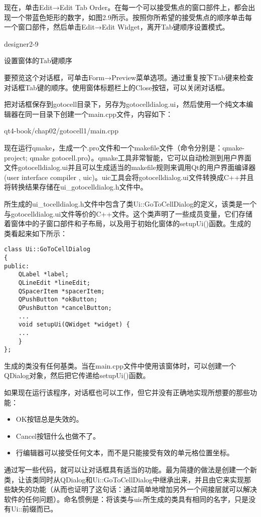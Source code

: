 \documentclass[11pt,oneside]{book}
\begin{document}
\begin{common-format}
现在，单击Edit→Edit Tab Order。在每一个可以接受焦点的窗口部件上，都会出现一个带蓝色矩形的数字，如图2.9所示。按照你所希望的接受焦点的顺序单击每一个窗口部件，然后单击Edit→Edit Widget，离开Tab键顺序设置模式。

\begin{fig}[0.7]{designer2-9}
\caption{设置窗体的Tab键顺序}
\label{fig:designer2-9}
\end{fig}

要预览这个对话框，可单击Form→Preview菜单选项。通过重复按下Tab键来检查对话框Tab键的顺序。使用窗体标题栏上的Close按钮，可以关闭对话框。

把对话框保存到gotocell目录下，另存为gotocelldialog.ui，然后使用一个纯文本编辑器在同一目录下创建一个main.cpp文件，内容如下：
\begin{cppinput}{qt4-book/chap02/gotocell1/main.cpp}
\end{cppinput}

现在运行qmake，生成一个.pro文件和一个makefile文件（命令分别是：qmake-project; qmake gotocell.pro）。qmake工具非常智能，它可以自动检测到用户界面文件gotocelldialog.ui并且可以生成适当的makefile规则来调用Qt的用户界面编译器(user interface compiler , uic)。uic工具会将gotocelldialog.ui文件转换成C++并且将转换结果存储在ui\_{}gotocelldialog.h文件中。

所生成的ui\_{}tocelldialog.h文件中包含了类Ui::GoToCellDialog的定义，该类是一个与gotocelldialog.ui文件等价的C++文件。这个类声明了一些成员变量，它们存储着窗体中的子窗口部件和子布局，以及用于初始化窗体的setupUi()函数。生成的类看起来如下所示：
\begin{Verbatim}
class Ui::GoToCellDialog
{
public:
    QLabel *label;
    QLineEdit *lineEdit;
    QSpacerItem *spacerItem;
    QPushButton *okButton;
    QPushButton *cancelButton;
    ...
    void setupUi(QWidget *widget) {
    ...
    }
};
\end{Verbatim}

生成的类没有任何基类。当在main.cpp文件中使用该窗体时，可以创建一个QDialog对象，然后把它传递给setupUi()函数。

如果现在运行该程序，对话框也可以工作，但它并没有正确地实现所想要的那些功能：    
\begin{itemize}
\item OK按钮总是失效的。
\item Cancel按钮什么也做不了。
\item 行编辑器可以接受任何文本，而不是只能接受有效的单元格位置坐标。
\end{itemize}

通过写一些代码，就可以让对话框具有适当的功能。最为简捷的做法是创建一个新类，让该类同时从QDialog和Ui::GoToCellDialog中继承出来，并且由它来实现那些缺失的功能（从而也证明了这句话：通过简单地增加另外一个间接层就可以解决软件的任何问题）。命名惯例是：将该类与uic所生成的类具有相同的名字，只是没有Ui::前缀而已。


\end{common-format}
\end{document}
